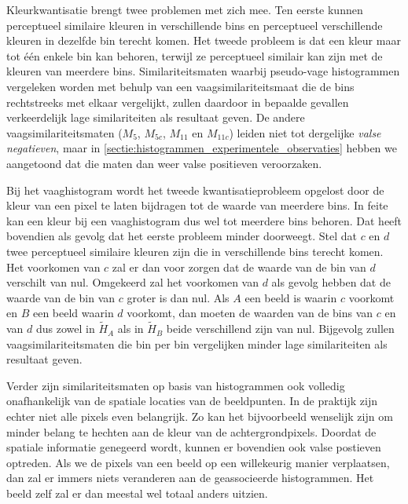 Kleurkwantisatie brengt twee problemen met zich mee. Ten eerste kunnen 
perceptueel similaire kleuren in verschillende bins en perceptueel 
verschillende kleuren in dezelfde bin terecht komen. Het tweede probleem is dat 
een kleur maar tot \'e\'en enkele bin kan behoren, terwijl ze perceptueel 
similair kan zijn met de kleuren van meerdere bins. Similariteitsmaten waarbij 
pseudo-vage histogrammen vergeleken worden met behulp van een 
vaagsimilariteitsmaat die de bins rechtstreeks met elkaar vergelijkt, zullen 
daardoor in bepaalde gevallen verkeerdelijk lage similariteiten als resultaat 
geven. De andere vaagsimilariteitsmaten ($M_5$, $M_{5c}$, $M_{11}$ en 
$M_{11c}$) leiden niet tot dergelijke \emph{valse negatieven}, maar in 
\ref{sectie:histogrammen_experimentele_observaties} hebben we aangetoond dat 
die maten dan weer valse positieven veroorzaken.

Bij het vaaghistogram wordt het tweede kwantisatieprobleem opgelost
door de kleur van een pixel te laten bijdragen tot de waarde van meerdere bins. In feite kan een kleur
bij een vaaghistogram dus wel tot meerdere bins behoren. Dat heeft
bovendien als gevolg dat het eerste probleem minder doorweegt. Stel dat $c$ en $d$ twee perceptueel
similaire kleuren zijn die in verschillende bins terecht komen. Het
voorkomen van $c$ zal er dan voor zorgen dat de waarde van de bin van $d$ verschilt van nul.
Omgekeerd zal het voorkomen van $d$ als gevolg hebben dat de waarde van de bin van $c$ groter is
dan nul. Als $A$ een beeld is waarin $c$ voorkomt en $B$ een beeld waarin $d$ voorkomt, dan
moeten de waarden van de bins van $c$ en van $d$ dus zowel in $\widetilde{H}_A$ als in 
$\widetilde{H}_B$ beide verschillend zijn van nul. Bijgevolg zullen vaagsimilariteitsmaten
die bin per bin vergelijken minder lage similariteiten als resultaat geven.

Verder zijn similariteitsmaten op basis van histogrammen ook volledig onafhankelijk van de 
spatiale locaties van de beeldpunten. In
de praktijk zijn echter niet alle pixels even belangrijk. Zo kan het
bijvoorbeeld wenselijk zijn om minder belang te hechten aan de kleur van
de achtergrondpixels. Doordat de spatiale informatie genegeerd wordt,
kunnen er bovendien ook valse postieven optreden. Als we de pixels van een
beeld op een willekeurig manier verplaatsen, dan zal er immers niets veranderen aan
de geassocieerde histogrammen. Het beeld zelf zal er dan meestal wel totaal anders uitzien.  

